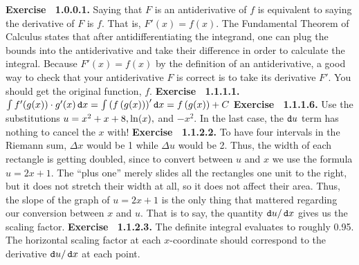 \par 
 {\noindent \protect \bf  Exercise ~1.0.0.1.} Saying that $F$ is an antiderivative of $f$ is equivalent to saying the derivative of $F$ is $f$. That is, $F'(x)=f(x)$. The Fundamental Theorem of Calculus states that after antidifferentiating the integrand, one can plug the bounds into the antiderivative and take their difference in order to calculate the integral. Because $F'(x)=f(x)$ by the definition of an antiderivative, a good way to check that your antiderivative $F$ is correct is to take its derivative $F'$. You should get the original function, $f$. \protect \newline  \protect \newline  
 {\noindent \protect \bf  Exercise ~1.1.1.1.} $ \intop f'(g(x)) \cdot g'(x) \mathop {}\protect \tmspace  -\thinmuskip {.1667em}\protect \mathtt  {d}x = \intop \left (f\left (g(x)\right )\right )' \mathop {}\protect \tmspace  -\thinmuskip {.1667em}\protect \mathtt  {d}x= f\left (g(x)\right )+C$ \protect \newline  \protect \newline  
 {\noindent \protect \bf  Exercise ~1.1.1.6.} Use the substitutions $u=x^2+x+8, \protect \qopname  \relax o{ln}(x),$ and $-x^2$. In the last case, the $\mathop {}\protect \tmspace  -\thinmuskip {.1667em}\protect \mathtt  {d}u$ term has nothing to cancel the $x$ with! \protect \newline  \protect \newline  
 {\noindent \protect \bf  Exercise ~1.1.2.2.} To have four intervals in the Riemann sum, $\Delta x$ would be 1 while $\Delta u$ would be 2. Thus, the width of each rectangle is getting doubled, since to convert between $u$ and $x$ we use the formula $u=2x+1$. The ``plus one'' merely slides all the rectangles one unit to the right, but it does not stretch their width at all, so it does not affect their area. Thus, the slope of the graph of $u=2x+1$ is the only thing that mattered regarding our conversion between $x$ and $u$. That is to say, the quantity $\mathop {}\protect \tmspace  -\thinmuskip {.1667em}\protect \mathtt  {d}u/ \mathop {}\protect \tmspace  -\thinmuskip {.1667em}\protect \mathtt  {d}x$ gives us the scaling factor. \protect \newline  \protect \newline  
 {\noindent \protect \bf  Exercise ~1.1.2.3.} The definite integral evaluates to roughly 0.95. The horizontal scaling factor at each $x$-coordinate should correspond to the derivative $\mathop {}\protect \tmspace  -\thinmuskip {.1667em}\protect \mathtt  {d}u /\mathop {}\protect \tmspace  -\thinmuskip {.1667em}\protect \mathtt  {d}x$ at each point.  \protect \newline  \protect \newline  
